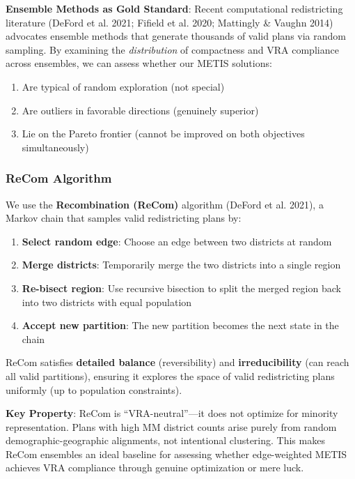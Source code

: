 \textbf{Ensemble Methods as Gold Standard}: Recent computational redistricting literature (DeFord et al. 2021; Fifield et al. 2020; Mattingly \& Vaughn 2014) advocates ensemble methods that generate thousands of valid plans via random sampling. By examining the \emph{distribution} of compactness and VRA compliance across ensembles, we can assess whether our METIS solutions:
\begin{enumerate}
    \item Are typical of random exploration (not special)
    \item Are outliers in favorable directions (genuinely superior)
    \item Lie on the Pareto frontier (cannot be improved on both objectives simultaneously)
\end{enumerate}

\subsubsection{ReCom Algorithm}

We use the \textbf{Recombination (ReCom)} algorithm (DeFord et al. 2021), a Markov chain that samples valid redistricting plans by:

\begin{enumerate}
    \item \textbf{Select random edge}: Choose an edge between two districts at random
    \item \textbf{Merge districts}: Temporarily merge the two districts into a single region
    \item \textbf{Re-bisect region}: Use recursive bisection to split the merged region back into two districts with equal population
    \item \textbf{Accept new partition}: The new partition becomes the next state in the chain
\end{enumerate}

ReCom satisfies \textbf{detailed balance} (reversibility) and \textbf{irreducibility} (can reach all valid partitions), ensuring it explores the space of valid redistricting plans uniformly (up to population constraints).

\textbf{Key Property}: ReCom is ``VRA-neutral''---it does not optimize for minority representation. Plans with high MM district counts arise purely from random demographic-geographic alignments, not intentional clustering. This makes ReCom ensembles an ideal baseline for assessing whether edge-weighted METIS achieves VRA compliance through genuine optimization or mere luck.

